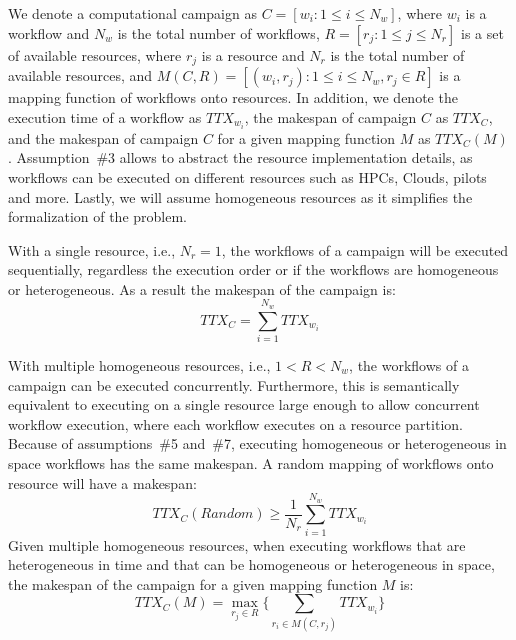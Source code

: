 We denote a computational campaign as $C = [w_{i}: 1 \leq i \leq N_{w}]$, where $w_{i}$ is a workflow and $N_{w}$ is the total number of workflows, $R = [ r_{j}: 1 \leq j \leq N_{r}]$ is a set of available resources, where $r_{j}$ is a resource and $N_{r}$ is the total number of available resources, and $ M(C,R) = [(w_i, r_j): 1 \leq i \leq N_{w}, r_j \in R] $ is a mapping function of workflows onto resources.
In addition, we denote the execution time of a workflow as $TTX_{w_{i}}$, the makespan of campaign $C$ as $TTX_{C}$, and the makespan of campaign $C$ for a given mapping function $ M $ as $TTX_{C}(M)$.
Assumption~\#3 allows to abstract the resource implementation details, as workflows can be executed on different resources such as HPCs, Clouds, pilots and more. 
Lastly, we will assume homogeneous resources as it simplifies the formalization of the problem.

With a single resource, i.e., $N_{r} = 1$, the workflows of a campaign will be executed sequentially, regardless the execution order or if the workflows are homogeneous or heterogeneous.
As a result the makespan of the campaign is:
\begin{equation}
   TTX_{C} = \sum_{i=1}^{N_{w}}TTX_{w_{i}} 
\end{equation}

With multiple homogeneous resources, i.e., $1 < R < N_{w}$, the workflows of a campaign can be executed concurrently.
Furthermore, this is semantically equivalent to executing on a single resource large enough to allow concurrent workflow execution, where each workflow executes on a resource partition. 
Because of assumptions~\#5 and~\#7, executing homogeneous or heterogeneous in space workflows has the same makespan.
A random mapping of workflows onto resource will have a makespan:
\begin{equation}
   TTX_{C}(Random) \geq \frac{1}{N_{r}}\sum_{i=1}^{N_{w}} TTX_{w_{i}} 
\end{equation}
Given multiple homogeneous resources, when executing workflows that are heterogeneous in time and that can be homogeneous or heterogeneous in space, the makespan of the campaign for a given mapping function $ M $ is:
\begin{equation}
TTX_{C}(M) = \max_{r_{j}\in R}\Big\{\sum_{r_{i}\in M(C,r_{j})}TTX_{w_{i}}\Big\}
\label{eq:makespan}
\end{equation}

